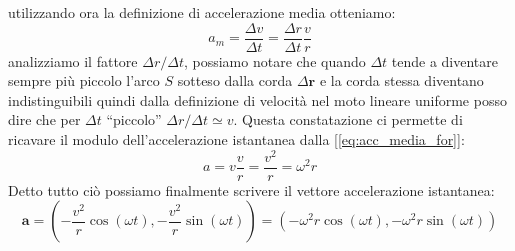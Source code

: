 \documentclass[a4paper,10pt,oneside]{article}
\begin{document}
utilizzando ora la definizione di accelerazione media otteniamo:
\begin{equation}\label{eq:acc_media_for}
 a_m=\frac{\Delta v}{\Delta t}=\frac{\Delta r}{\Delta t}\frac{v}{r}
\end{equation}
analizziamo il fattore $\Delta r/\Delta t$, possiamo notare che quando $\Delta t$ tende a diventare sempre più piccolo l'arco $S$ sotteso dalla corda $\Delta\mathbf{r}$ e la corda stessa diventano indistinguibili quindi dalla definizione di velocità nel moto lineare uniforme posso dire che per $\Delta t$ ``piccolo'' $\Delta r/\Delta t\simeq v$. Questa constatazione ci permette di ricavare il modulo dell'accelerazione istantanea dalla [\ref{eq:acc_media_for}]:
\begin{equation}
 a=v\frac{v}{r}=\frac{v^2}{r}=\omega^2r
\end{equation}
Detto tutto ciò possiamo finalmente scrivere il vettore accelerazione istantanea:
\begin{equation}
 \mathbf{a}=\left(-\frac{v^2}{r}\cos (\omega t),-\frac{v^2}{r}\sin (\omega t)\right)=(-\omega^2r\cos(\omega t),-\omega^2r\sin (\omega t))
\end{equation}
\end{document}
